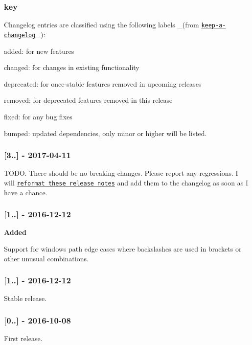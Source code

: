 \subsubsection*{key}

Changelog entries are classified using the following labels \+\_\+(from \href{https://github.com/olivierlacan/keep-a-changelog}{\tt keep-\/a-\/changelog}\+\_\+)\+:


\begin{DoxyItemize}
\item {\ttfamily added}\+: for new features
\item {\ttfamily changed}\+: for changes in existing functionality
\item {\ttfamily deprecated}\+: for once-\/stable features removed in upcoming releases
\item {\ttfamily removed}\+: for deprecated features removed in this release
\item {\ttfamily fixed}\+: for any bug fixes
\item {\ttfamily bumped}\+: updated dependencies, only minor or higher will be listed.
\end{DoxyItemize}

\subsubsection*{\mbox{[}3..\mbox{]} -\/ 2017-\/04-\/11}

T\+O\+DO. There should be no breaking changes. Please report any regressions. I will \href{https://github.com/micromatch/micromatch/pull/76}{\tt reformat these release notes} and add them to the changelog as soon as I have a chance.

\subsubsection*{\mbox{[}1..\mbox{]} -\/ 2016-\/12-\/12}

{\bfseries Added}


\begin{DoxyItemize}
\item Support for windows path edge cases where backslashes are used in brackets or other unusual combinations.
\end{DoxyItemize}

\subsubsection*{\mbox{[}1..\mbox{]} -\/ 2016-\/12-\/12}

Stable release.

\subsubsection*{\mbox{[}0..\mbox{]} -\/ 2016-\/10-\/08}

First release. 